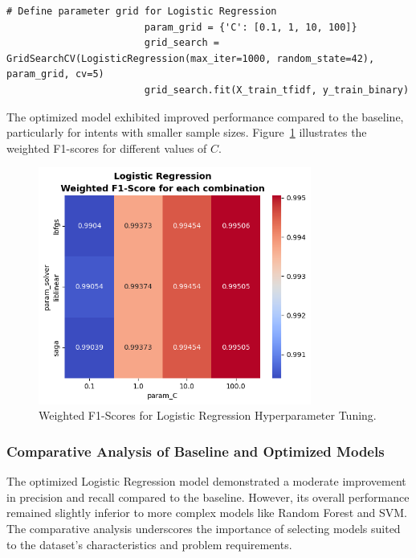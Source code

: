                     \begin{lstlisting}[caption={Parameter grid for Logistic Regression}, label={lst:logistic_param_grid}]
                        # Define parameter grid for Logistic Regression
                        param_grid = {'C': [0.1, 1, 10, 100]}
                        grid_search = GridSearchCV(LogisticRegression(max_iter=1000, random_state=42), param_grid, cv=5)
                        grid_search.fit(X_train_tfidf, y_train_binary)
                    \end{lstlisting}

            The optimized model exhibited improved performance compared to the baseline, particularly for intents with smaller sample sizes. Figure~\ref{fig:logistic_tuning} illustrates the weighted F1-scores for different values of \( C \).

            \begin{figure}[H]
                \centering
                \includegraphics[width=0.8\textwidth]{../figures/plots/section2/weighted_f1_score_for_each_combination_of_parameters_logistic_regression.png}
                \caption{Weighted F1-Scores for Logistic Regression Hyperparameter Tuning.}
                \label{fig:logistic_tuning}
            \end{figure}

        \subsubsection{Comparative Analysis of Baseline and Optimized Models \\}

            The optimized Logistic Regression model demonstrated a moderate improvement in precision and recall compared to the baseline. However, its overall performance remained slightly inferior to more complex models like Random Forest and SVM. The comparative analysis underscores the importance of selecting models suited to the dataset's characteristics and problem requirements.
